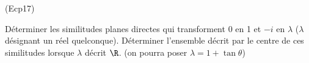\begin{tiny}(Ecp17)\end{tiny}
D{\'e}terminer les similitudes planes directes qui transforment $0$ en 1 et $-i$ en $\lambda $ ($\lambda $ d{\'e}signant un r{\'e}el quelconque).
\newline
D{\'e}terminer l'ensemble d{\'e}crit par le centre de ces similitudes lorsque $\lambda $ d{\'e}crit $\R$. (on pourra poser $\lambda =1+\tan \theta $)